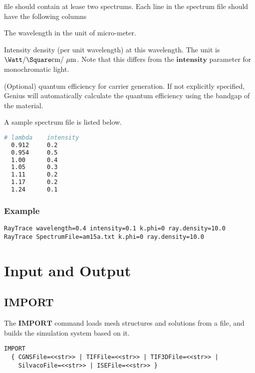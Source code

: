 \documentclass[oneside,12pt]{cgd_book}
\begin{document}
            file should contain at lease two spectrums. Each line in the spectrum file should have the following
            columns
\begin{compactitem}
\item The wavelength in the unit of micro-meter.
\par
\item Intensity density (per unit wavelength) at this wavelength. The unit is
$\Watt\Per\Square\cMeter\Per\uMeter$. Note that this differs from the
$\mathbf{intensity}$ parameter for monochromatic light.
\par
\item (Optional) quantum efficiency for carrier generation. If not explicitly specified, Genius will
                  automatically calculate the quantum efficiency using the bandgap of the material.
\par
\end{compactitem}
\par
\par
A sample spectrum file is listed below.
\par
\begin{lstlisting}[language=sh]
# lambda    intensity
  0.912     0.2
  0.954     0.5
  1.00      0.4
  1.05      0.3
  1.11      0.2
  1.17      0.2
  1.24      0.1
\end{lstlisting}
\par
\subsubsection{Example}
\begin{lstlisting}[style=GeniusCode]
RayTrace wavelength=0.4 intensity=0.1 k.phi=0 ray.density=10.0
RayTrace SpectrumFile=am15a.txt k.phi=0 ray.density=10.0
\end{lstlisting}
\section{Input and Output}
\par
\subsection{IMPORT}
The $\mathbf{IMPORT}$
command loads mesh structures and solutions from a file, and builds
        the simulation system based on it.
\par
\begin{lstlisting}[style=GeniusCmd]
IMPORT
  { CGNSFile=<<str>> | TIFFile=<<str>> | TIF3DFile=<<str>> |
    SilvacoFile=<<str>> | ISEFile=<<str>> }
\end{lstlisting}
\par
\end{document}
